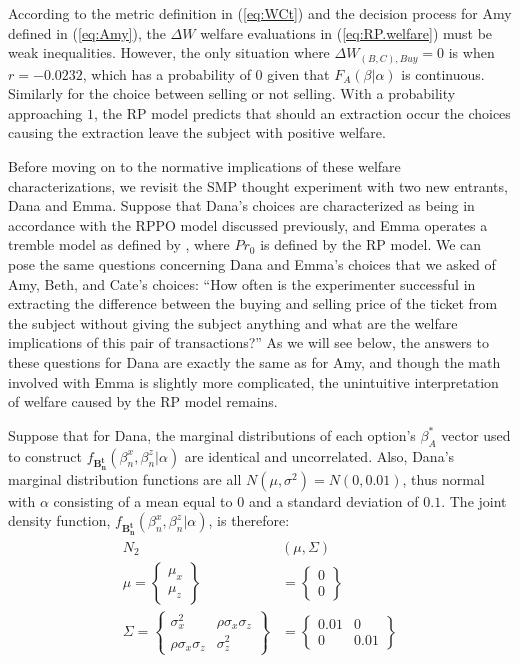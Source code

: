 \documentclass[11pt,a4paper]{article}
\newcommand\Prob{\ensuremath{\mathit{Pr}}}  %
\begin{document}
According to the metric definition in (\ref{eq:WCt}) and the decision process for Amy defined in (\ref{eq:Amy}), the $\Delta W$ welfare evaluations in (\ref{eq:RP.welfare}) must be weak inequalities.
However, the only situation where $\Delta W_{(B,C),\mathit{Buy}} = 0$ is when $r=-0.0232$, which has a probability of $0$ given that $F_A(\beta|\alpha)$ is continuous.
Similarly for the choice between selling or not selling.
With a probability approaching $1$, the RP model predicts that should an extraction occur the choices causing the extraction leave the subject with positive welfare.

Before moving on to the normative implications of these welfare characterizations, we revisit the SMP thought experiment with two new entrants, Dana and Emma.
Suppose that Dana's choices are characterized as being in accordance with the RPPO model discussed previously, and Emma operates a tremble model as defined by \textcite{Loomes2002}, where $ {\Prob}_0$ is defined by the RP model.
We can pose the same questions concerning Dana and Emma's choices that we asked of Amy, Beth, and Cate's choices: \enquote{How often is the experimenter successful in extracting the difference between the buying and selling price of the ticket from the subject without giving the subject anything and what are the welfare implications of this pair of transactions?} 
As we will see below, the answers to these questions for Dana are exactly the same as for Amy, and though the math involved with Emma is slightly more complicated, the unintuitive interpretation of welfare caused by the RP model remains.

Suppose that for Dana, the marginal distributions of each option's $\beta_A^*$ vector used to construct $f_{\mathbf{B_n^t}}(\beta_n^ x,\beta_n^ z|\alpha)$ are identical and uncorrelated.{\footnotemark}
Also, Dana's marginal distribution functions are all $N(\mu,\sigma^2) = N(0,0.01)$, thus normal with $\alpha$ consisting of a mean equal to $0$ and a standard deviation of $0.1$.
The joint density function, $f_{\mathbf{B_n^t}}(\beta_n^x,\beta_n^z|\alpha)$, is therefore:
\begin{align}
	\begin{split}
		N_2&(\mu,\Sigma) \\
		\mu =\begin{Bmatrix}\mu_x \\ \mu_z\end{Bmatrix} &= \begin{Bmatrix}0\\0\end{Bmatrix}\\
		\Sigma =\begin{Bmatrix} \sigma_x^2 & \rho\sigma_x\sigma_z \\  \rho\sigma_x\sigma_z & \sigma_z^2 \end{Bmatrix} &= 
	\begin{Bmatrix} 0.01 & 0 \\  0 & 0.01 \end{Bmatrix} 
	\end{split}
\end{align}
\end{document}
